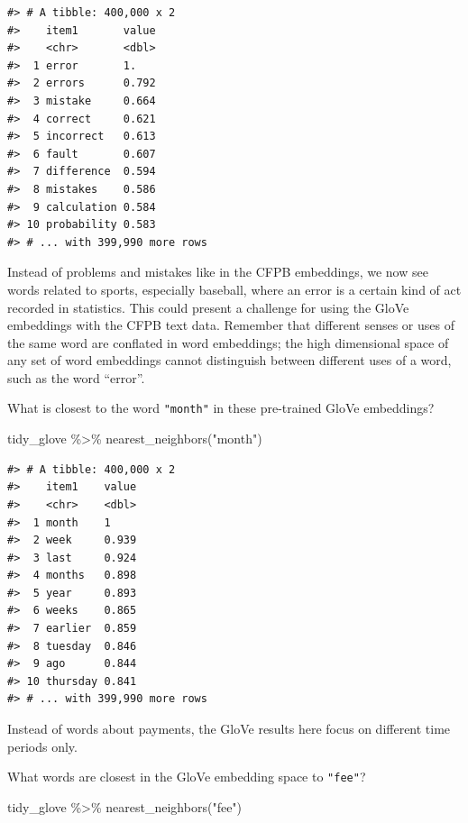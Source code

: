 \documentclass[
]{krantz}
\makeatletter
\newenvironment{Shaded}{\begin{snugshade}}{\end{snugshade}}
\newcommand{\FunctionTok}[1]{\textcolor[rgb]{0.00,0.00,0.00}{#1}}
\newcommand{\NormalTok}[1]{#1}
\newcommand{\SpecialCharTok}[1]{\textcolor[rgb]{0.00,0.00,0.00}{#1}}
\newcommand{\StringTok}[1]{\textcolor[rgb]{0.31,0.60,0.02}{#1}}
\newenvironment{kframe}{%
\medskip{}
\setlength{\fboxsep}{.8em}
 \def\at@end@of@kframe{}%
 \ifinner\ifhmode%
  \def\at@end@of@kframe{\end{minipage}}%
  \begin{minipage}{\columnwidth}%
 \fi\fi%
 \def\FrameCommand##1{\hskip\@totalleftmargin \hskip-\fboxsep
 \colorbox{shadecolor}{##1}\hskip-\fboxsep
     \hskip-\linewidth \hskip-\@totalleftmargin \hskip\columnwidth}%
 \MakeFramed {\advance\hsize-\width
   \@totalleftmargin\z@ \linewidth\hsize
   \@setminipage}}%
 {\par\unskip\endMakeFramed%
 \at@end@of@kframe}
\renewenvironment{Shaded}{\begin{kframe}}{\end{kframe}}
\makeatother
\begin{document}
\begin{verbatim}
#> # A tibble: 400,000 x 2
#>    item1       value
#>    <chr>       <dbl>
#>  1 error       1.   
#>  2 errors      0.792
#>  3 mistake     0.664
#>  4 correct     0.621
#>  5 incorrect   0.613
#>  6 fault       0.607
#>  7 difference  0.594
#>  8 mistakes    0.586
#>  9 calculation 0.584
#> 10 probability 0.583
#> # ... with 399,990 more rows
\end{verbatim}

Instead of problems and mistakes like in the CFPB embeddings, we now see words related to sports, especially baseball, where an error is a certain kind of act recorded in statistics. This could present a challenge for using the GloVe embeddings with the CFPB text data. Remember that different senses or uses of the same word are conflated in word embeddings; the high dimensional space of any set of word embeddings cannot distinguish between different uses of a word, such as the word ``error''.

What is closest to the word \texttt{"month"} in these pre-trained GloVe embeddings?

\begin{Shaded}
\begin{Highlighting}[]
\NormalTok{tidy\_glove }\SpecialCharTok{\%\textgreater{}\%}
    \FunctionTok{nearest\_neighbors}\NormalTok{(}\StringTok{"month"}\NormalTok{)}
\end{Highlighting}
\end{Shaded}

\begin{verbatim}
#> # A tibble: 400,000 x 2
#>    item1    value
#>    <chr>    <dbl>
#>  1 month    1    
#>  2 week     0.939
#>  3 last     0.924
#>  4 months   0.898
#>  5 year     0.893
#>  6 weeks    0.865
#>  7 earlier  0.859
#>  8 tuesday  0.846
#>  9 ago      0.844
#> 10 thursday 0.841
#> # ... with 399,990 more rows
\end{verbatim}

Instead of words about payments, the GloVe results here focus on different time periods only.

What words are closest in the GloVe embedding space to \texttt{"fee"}?

\begin{Shaded}
\begin{Highlighting}[]
\NormalTok{tidy\_glove }\SpecialCharTok{\%\textgreater{}\%}
    \FunctionTok{nearest\_neighbors}\NormalTok{(}\StringTok{"fee"}\NormalTok{)}
\end{Highlighting}
\end{Shaded}
\end{document}

